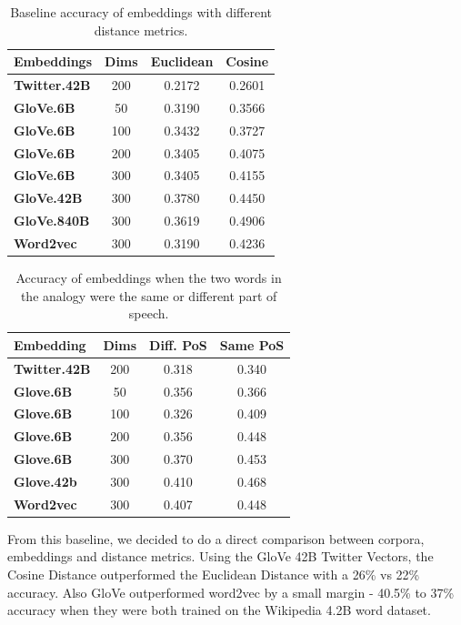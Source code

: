 \documentclass[11pt]{article}
\begin{document}
\begin{table}[h]
\begin{center}
\begin{tabular}{|l|ccc|}
\hline \bf Embeddings & \bf Dims & \bf Euclidean & \bf Cosine \\ \hline
	\bf Twitter.42B & 200 & 0.2172 & 0.2601 \\
	\bf GloVe.6B & 50 & 0.3190 & 0.3566 \\
	\bf GloVe.6B & 100 & 0.3432 & 0.3727 \\
	\bf GloVe.6B & 200 & 0.3405 & 0.4075 \\
	\bf GloVe.6B & 300 & 0.3405 & 0.4155 \\
	\bf GloVe.42B & 300 & 0.3780 & 0.4450 \\
	\bf GloVe.840B & 300 & 0.3619 & 0.4906 \\
	\bf Word2vec & 300 & 0.3190 & 0.4236 \\\hline
\end{tabular}
\end{center}
\caption{\label{font-table} Baseline accuracy of embeddings with different distance metrics.}
\end{table}

\begin{table}[h]
\begin{center}
\begin{tabular}{|l|ccc|}
\hline\bf Embedding & \bf Dims & \bf Diff. PoS & \bf Same PoS \\\hline
\bf Twitter.42B & 200 & 0.318 & 0.340 \\
\bf Glove.6B & 50 & 0.356 & 0.366 \\
\bf Glove.6B & 100 & 0.326 & 0.409 \\
\bf Glove.6B & 200 & 0.356 & 0.448 \\
\bf Glove.6B & 300 & 0.370 & 0.453 \\
\bf Glove.42b & 300 & 0.410 & 0.468 \\
\bf Word2vec & 300 & 0.407 & 0.448 \\\hline
\end{tabular}
\end{center}
\caption{\label{font-table} Accuracy of embeddings when the two words in the analogy were the same or different part of speech.}
\end{table}

From this baseline, we decided to do a direct comparison between
corpora, embeddings and distance metrics. Using the GloVe 42B Twitter
Vectors, the Cosine Distance outperformed the Euclidean Distance with a
26\% vs 22\% accuracy. Also GloVe outperformed word2vec by a small
margin - 40.5\% to 37\% accuracy when they were both trained on the
Wikipedia 4.2B word dataset.
\end{document}
